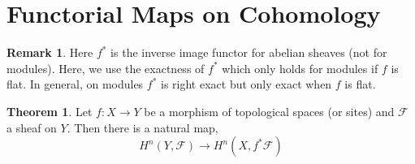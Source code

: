 \documentclass[12pt]{extarticle}
\theoremstyle{definition}
\newtheorem{theorem}{Theorem}[section]
\newtheorem{remark}{Remark}
\newcommand{\F}{\mathcal{F}}
\begin{document}
\section{Functorial Maps on Cohomology}

\newcommand{\J}{\mathcal{J}}
\newcommand{\Pic}[1]{\mathrm{Pic}\left( #1 \right)}
\newcommand{\I}{\mathscr{I}}

\begin{remark}
Here $f^*$ is the inverse image functor for abelian sheaves (not for modules). Here, we use the exactness of $f^*$ which only holds for modules if $f$ is flat. In general, on modules $f^*$ is right exact but only exact when $f$ is flat.
\end{remark}

\begin{theorem}
Let $f : X \to Y$ be a morphism of topological spaces (or sites) and $\F$ a sheaf on $Y$. Then there is a natural map,
\[ H^n(Y, \F) \to H^n(X, f^* \F) \]
\end{theorem}
\end{document}

